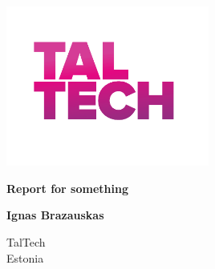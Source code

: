 \begin{titlepage}
    \begin{center}
        
        
        \includegraphics[width=0.5\textwidth]{pictures/TalTech_Gradient.png}
        \vspace*{1cm}
        
        {
            \Large 
            \textbf{Report for something}
        }

        \vspace{1.5cm}
        {
            \large
            \textbf{Ignas Brazauskas} \\
        }
        \vfill


        \vspace{0.8cm}

        

        TalTech\\
        Estonia\\
        \the\year{}

    \end{center}
\end{titlepage}